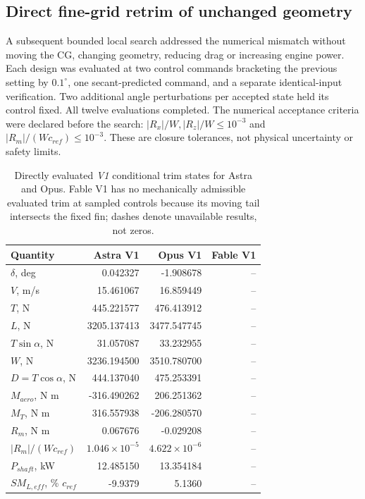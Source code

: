 \documentclass[10pt,letterpaper]{article}
\begin{document}
\subsection{Direct fine-grid retrim of unchanged geometry}
A subsequent bounded local search addressed the numerical mismatch without moving the CG, changing geometry, reducing drag or increasing engine power. Each design was evaluated at two control commands bracketing the previous setting by $0.1^\circ$, one secant-predicted command, and a separate identical-input verification. Two additional angle perturbations per accepted state held its control fixed. All twelve evaluations completed. The numerical acceptance criteria were declared before the search: $|R_x|/W,|R_z|/W\leq10^{-3}$ and $|R_m|/(Wc_{ref})\leq10^{-3}$. These are closure tolerances, not physical uncertainty or safety limits.

\begin{table}[H]\centering\small
\caption{Directly evaluated \emph{V1} conditional trim states for Astra and Opus. Fable V1 has no mechanically admissible evaluated trim at sampled controls because its moving tail intersects the fixed fin; dashes denote unavailable results, not zeros.}\label{tab:retrim}
\begin{tabular}{lrrr}\toprule
Quantity & Astra V1 & Opus V1 & Fable V1\\\midrule
$\delta$, deg &0.042327&-1.908678&--\\
$V$, m/s &15.461067&16.859449&--\\
$T$, N &445.221577&476.413912&--\\
$L$, N &3205.137413&3477.547745&--\\
$T\sin\alpha$, N &31.057087&33.232955&--\\
$W$, N &3236.194500&3510.780700&--\\
$D=T\cos\alpha$, N &444.137040&475.253391&--\\
$M_{aero}$, N m &-316.490262&206.251362&--\\
$M_T$, N m &316.557938&-206.280570&--\\
$R_m$, N m &0.067676&-0.029208&--\\
$|R_m|/(Wc_{ref})$ &$1.046\times10^{-5}$&$4.622\times10^{-6}$&--\\
$P_{shaft}$, kW &12.485150&13.354184&--\\
$SM_{L,eff}$, \% $c_{ref}$ &-9.9379&5.1360&--\\\bottomrule
\end{tabular}
\end{table}
\end{document}
